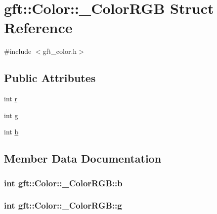 \hypertarget{structgft_1_1Color_1_1__ColorRGB}{}\section{gft\+:\+:Color\+:\+:\+\_\+\+Color\+R\+GB Struct Reference}
\label{structgft_1_1Color_1_1__ColorRGB}


{\ttfamily \#include $<$gft\+\_\+color.\+h$>$}

\subsection*{Public Attributes}
\begin{DoxyCompactItemize}
\item 
int \hyperlink{structgft_1_1Color_1_1__ColorRGB_aef66edd58713d34d554205dd8fb636ad}{r}
\item 
int \hyperlink{structgft_1_1Color_1_1__ColorRGB_a2b271c9a718bd0b4c77d857b3e6218e5}{g}
\item 
int \hyperlink{structgft_1_1Color_1_1__ColorRGB_ac3cabaf6b8214ec517001ec1eb7f250a}{b}
\end{DoxyCompactItemize}


\subsection{Member Data Documentation}
\subsubsection[{\texorpdfstring{b}{b}}]{\setlength{\rightskip}{0pt plus 5cm}int gft\+::\+Color\+::\+\_\+\+Color\+R\+G\+B\+::b}\hypertarget{structgft_1_1Color_1_1__ColorRGB_ac3cabaf6b8214ec517001ec1eb7f250a}{}\label{structgft_1_1Color_1_1__ColorRGB_ac3cabaf6b8214ec517001ec1eb7f250a}
\subsubsection[{\texorpdfstring{g}{g}}]{\setlength{\rightskip}{0pt plus 5cm}int gft\+::\+Color\+::\+\_\+\+Color\+R\+G\+B\+::g}\hypertarget{structgft_1_1Color_1_1__ColorRGB_a2b271c9a718bd0b4c77d857b3e6218e5}{}\label{structgft_1_1Color_1_1__ColorRGB_a2b271c9a718bd0b4c77d857b3e6218e5}
